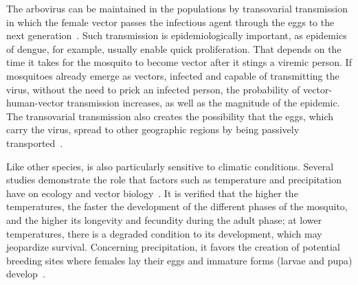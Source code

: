 The arbovirus can be maintained in the \Aedes populations by transovarial transmission in which the female vector passes the infectious agent through the eggs to the next generation~\cite{monath1994dengue}.
Such transmission is epidemiologically important, as epidemics of dengue, for example, usually enable quick proliferation.
That depends on the time it takes for the mosquito to become vector after it stings a viremic person.
If mosquitoes already emerge as vectors, \ie infected and capable of transmitting the virus, without the need to prick an infected person, the probability of vector-human-vector transmission increases, as well as the magnitude of the epidemic.
The transovarial transmission also creates the possibility that the \Aedes eggs, which carry the virus, spread to other geographic regions by being passively transported~\cite{monath1994dengue}.

Like other species, \Aedes is also particularly sensitive to climatic conditions.
Several studies demonstrate the role that factors such as temperature and precipitation have on ecology and vector biology~\cite{morin2013climate}.
It is verified that the higher the temperatures, the faster the development of the different phases of the mosquito, and the higher its longevity and fecundity during the adult phase; at lower temperatures, there is a degraded condition to its development, which may jeopardize survival.
Concerning precipitation, it favors the creation of potential breeding sites where females lay their eggs and immature forms (larvae and pupa) develop~\cite{Halstead2007dengue}.


